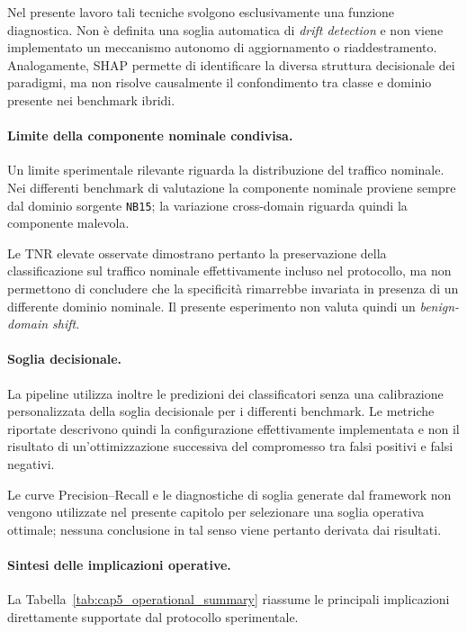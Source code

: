 Nel presente lavoro tali tecniche svolgono esclusivamente una funzione diagnostica. 
Non è definita una soglia automatica di \textit{drift detection} e non viene implementato un meccanismo autonomo di aggiornamento o riaddestramento. 
Analogamente, SHAP permette di identificare la diversa struttura decisionale dei paradigmi, ma non risolve causalmente il confondimento tra classe e dominio presente nei benchmark ibridi.

\paragraph{Limite della componente nominale condivisa.}
Un limite sperimentale rilevante riguarda la distribuzione del traffico nominale. 
Nei differenti benchmark di valutazione la componente nominale proviene sempre dal dominio sorgente \texttt{NB15}; la variazione cross-domain riguarda quindi la componente malevola.

Le TNR elevate osservate dimostrano pertanto la preservazione della classificazione sul traffico nominale effettivamente incluso nel protocollo, ma non permettono di concludere che la specificità rimarrebbe invariata in presenza di un differente dominio nominale. 
Il presente esperimento non valuta quindi un \textit{benign-domain shift}.

\paragraph{Soglia decisionale.}
La pipeline utilizza inoltre le predizioni dei classificatori senza una calibrazione personalizzata della soglia decisionale per i differenti benchmark. 
Le metriche riportate descrivono quindi la configurazione effettivamente implementata e non il risultato di un'ottimizzazione successiva del compromesso tra falsi positivi e falsi negativi.

Le curve Precision--Recall e le diagnostiche di soglia generate dal framework non vengono utilizzate nel presente capitolo per selezionare una soglia operativa ottimale; nessuna conclusione in tal senso viene pertanto derivata dai risultati.

\paragraph{Sintesi delle implicazioni operative.}
La Tabella~\ref{tab:cap5_operational_summary} riassume le principali implicazioni direttamente supportate dal protocollo sperimentale.

